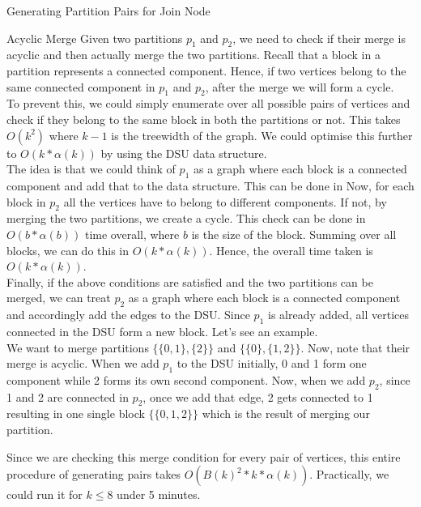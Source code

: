 \begin{section}{Generating Partition Pairs for Join Node}
	\begin{subsection}{Acyclic Merge}
		Given two partitions $p_1$ and $p_2$, we need to check if their merge is acyclic and then actually merge the two partitions. Recall that a block in a partition represents a connected component. Hence, if two vertices belong to the same connected component in $p_1$ and $p_2$, after the merge we will form a cycle. \\
		
		To prevent this, we could simply enumerate over all possible pairs of vertices and check if they belong to the same block in both the partitions or not. This takes $O(k^2)$ where $k-1$ is the treewidth of the graph. We could optimise this further to $O(k*\alpha(k))$ by using the DSU data structure. \\
		
		The idea is that we could think of $p_1$ as a graph where each block is a connected component and add that to the data structure. This can be done in Now, for each block in $p_2$ all the vertices have to belong to different components. If not, by merging the two partitions, we create a cycle. This check can be done in $O(b * \alpha(b))$ time overall, where $b$ is the size of the block. Summing over all blocks, we can do this in $O(k * \alpha(k))$. Hence, the overall time taken is $O(k * \alpha(k))$. \\
		
		Finally, if the above conditions are satisfied and the two partitions can be merged, we can treat $p_2$ as a graph where each block is a connected component and accordingly add the edges to the DSU. Since $p_1$ is already added, all vertices connected in the DSU form a new block. Let's see an example. \\
		
		We want to merge partitions $\{\{0, 1\}, \{2\}\}$ and $\{\{0\}, \{1, 2\}\}$. Now, note that their merge is acyclic. When we add $p_1$ to the DSU initially, 0 and 1 form one component while 2 forms its own second component. Now, when we add $p_2$, since 1 and 2 are connected in $p_2$, once we add that edge, 2 gets connected to 1 resulting in one single block $\{\{0, 1, 2\}\}$ which is the result of merging our partition. 
	\end{subsection}

	Since we are checking this merge condition for every pair of vertices, this entire procedure of generating pairs takes $O(B(k)^2 * k * \alpha(k))$. Practically, we could run it for $k \leq 8$ under 5 minutes. 
\end{section}